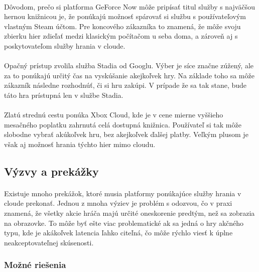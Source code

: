 \documentclass[10pt,twoside,slovak,a4paper]{article}
\begin{document}
\paragraph{} Dôvodom, prečo si platforma GeForce Now môže pripísať titul služby s najväčšou hernou knižnicou je, že ponúkajú možnosť spárovať si službu s používateľovým vlastným Steam účtom. Pre koncového zákazníka to znamená, že môže svoju zbierku hier zdieľať medzi klasickým počítačom u seba doma, a zároveň aj s poskytovateľom služby hrania v cloude.

\paragraph{} Opačný prístup zvolila služba Stadia od Googlu. Výber je síce značne zúžený, ale za to ponúkajú určitý čas na vyskúšanie akejkoľvek hry. Na základe toho sa môže zákazník následne rozhodnúť, či si hru zakúpi. V prípade že sa tak stane, bude táto hra prístupná len v službe Stadia.

\paragraph{} Zlatú strednú cestu ponúka Xbox Cloud, kde je v cene mierne vyššieho mesačného poplatku zahrnutá celá dostupná knižnica. Používateľ si tak môže slobodne vybrať akúkoľvek hru, bez akejkoľvek ďalšej platby. Veľkým plusom je však aj možnosť hrania týchto hier mimo cloudu.



\subsection{Výzvy a prekážky}

\paragraph{} Existuje mnoho prekážok, ktoré musia platformy ponúkajúce služby hrania v cloude prekonať. Jednou z mnoha výziev je problém s odozvou, čo v praxi znamená, že všetky akcie hráča majú určité oneskorenie predtým, než sa zobrazia na obrazovke. To môže byť ešte viac problematické ak sa jedná o hry akčného typu, kde je akákoľvek latencia ľahko citeľná, čo môže rýchlo viesť k úplne neakceptovateľnej skúsenosti. \cite{4591393} \cite{10.1145/1016540.1016557}

\subsubsection{Možné riešenia}
\end{document}
